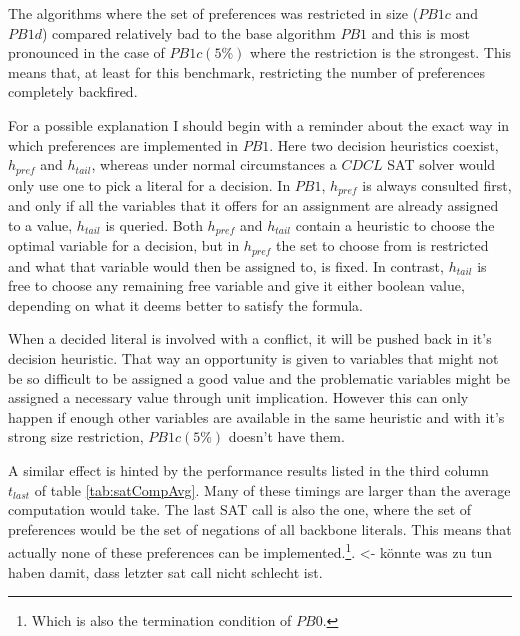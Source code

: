 The algorithms where the set of preferences was restricted in size ($PB1c$ and $PB1d$) compared relatively bad to the base algorithm $PB1$ and this is most pronounced in the case of $PB1c(5\%)$ where the restriction is the strongest. This means that, at least for this benchmark, restricting the number of preferences completely backfired.


For a possible explanation I should begin with a reminder about the exact way in which preferences are implemented in $PB1$. Here two decision heuristics coexist, $h_{pref}$ and $h_{tail}$, whereas under normal circumstances a $CDCL$ SAT solver would only use one to pick a literal for a decision. In $PB1$, $h_{pref}$ is always consulted first, and only if all the variables that it offers for an assignment are already assigned to a value, $h_{tail}$ is queried. Both $h_{pref}$ and $h_{tail}$ contain a heuristic to choose the optimal variable for a decision, but in $h_{pref}$ the set to choose from is restricted and what that variable would then be assigned to, is fixed. In contrast, $h_{tail}$ is free to choose any remaining free variable and give it either boolean value, depending on what it deems better to satisfy the formula.

When a decided literal is involved with a conflict, it will be pushed back in it's decision heuristic. That way an opportunity is given to variables that might not be so difficult to be assigned a good value and the problematic variables might be assigned a necessary value through unit implication. 
However this can only happen if enough other variables are available in the same heuristic and with it's strong size restriction, $PB1c(5\%)$ doesn't have them.


A similar effect is hinted by the performance results listed in the third column $t_{last}$ of table \ref{tab:satCompAvg}. Many of these timings are larger than the average computation would take. The last SAT call is also the one, where the set of preferences would be the set of negations of all backbone literals. This means that actually none of these preferences can be implemented.\footnote{
	Which is also the termination condition of $PB0$.}. <- könnte was zu tun haben damit, dass letzter sat call nicht schlecht ist.

